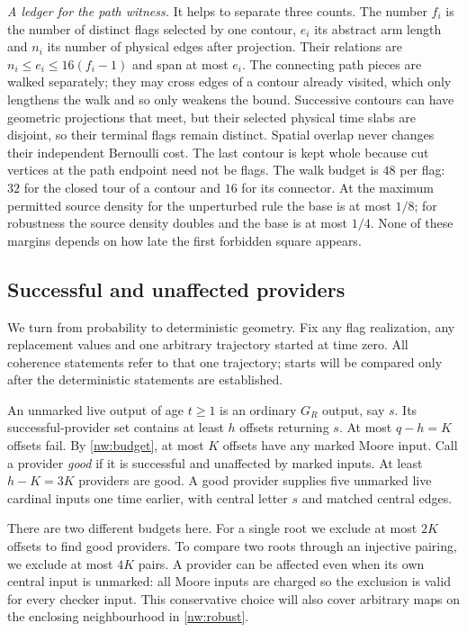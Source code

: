 \emph{A ledger for the path witness.} It helps to separate three counts. The number $f_i$ is the
number of distinct flags selected by one contour, $e_i$ its abstract arm length and $n_i$ its number
of physical edges after projection. Their relations are $n_i\le e_i\le16(f_i-1)$ and span at most
$e_i$. The connecting path pieces are walked separately; they may cross edges of a contour already
visited, which only lengthens the walk and so only weakens the bound. Successive contours can have
geometric projections that meet, but their selected physical time slabs are disjoint, so their
terminal flags remain distinct. Spatial overlap never changes their independent Bernoulli cost.
The last contour is kept whole because cut vertices at the path endpoint need not be flags. The
walk budget is $48$ per flag: $32$ for the closed tour of a contour and $16$ for its connector. At
the maximum permitted source density for the unperturbed rule the base is at most $1/8$; for
robustness the source density doubles and the base is at most $1/4$. None of these margins depends
on how late the first forbidden square appears.

\subsection{Successful and unaffected providers}

We turn from probability to deterministic geometry. Fix any flag realization, any replacement values and one arbitrary trajectory started at time zero. All coherence statements refer to that one trajectory; starts will be compared only after the deterministic statements are established.

An unmarked live output of age $t\ge1$ is an ordinary $G_R$ output, say $s$. Its successful-provider set contains at least $h$ offsets returning $s$. At most $q-h=K$ offsets fail. By \cref{nw:budget}, at most $K$ offsets have any marked Moore input. Call a provider \emph{good} if it is successful and unaffected by marked inputs. At least $h-K=3K$ providers are good. A good provider supplies five unmarked live cardinal inputs one time earlier, with central letter $s$ and matched central edges.

There are two different budgets here. For a single root we exclude at most $2K$ offsets to find good providers. To compare two roots through an injective pairing, we exclude at most $4K$ pairs. A provider can be affected even when its own central input is unmarked: all Moore inputs are charged so the exclusion is valid for every checker input. This conservative choice will also cover arbitrary maps on the enclosing neighbourhood in \cref{nw:robust}.

